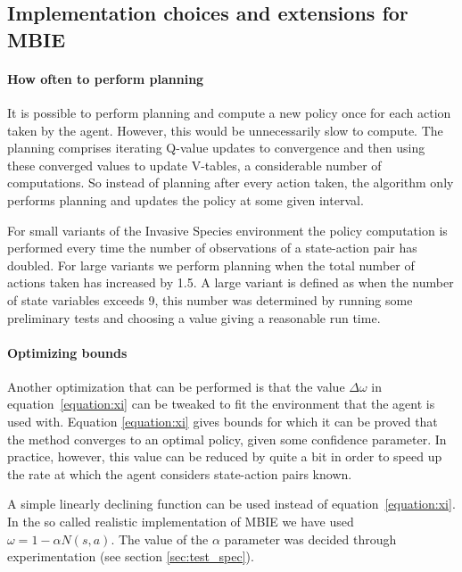 \subsection{Implementation choices and extensions for MBIE}
\label{sec:MBIE_our_contribution}

\paragraph{How often to perform planning}
\label{sec:mbie_perform_planning}

It is possible to perform planning and compute a new policy once for each
action taken by the agent. However, this would be unnecessarily slow to
compute. The planning comprises iterating Q-value updates to convergence and
then using these converged values to update V-tables, a considerable number of
computations. So instead of planning after every action taken, the algorithm
only performs planning and updates the policy at some given interval. 

For small variants of the Invasive Species environment the policy computation
is performed every time the number of observations of a state-action pair has
doubled. For large variants we perform planning when the total number of
actions taken has increased by 1.5. A large variant is defined as when the
number of state variables exceeds 9, this number was determined by running some
preliminary tests and choosing a value giving a reasonable run time.

\paragraph{Optimizing bounds}

Another optimization that can be performed is that the value $\Delta \omega$ in
equation~\eqref{equation:xi} can be tweaked to fit the environment that the
agent is used with. Equation \eqref{equation:xi} gives bounds for which it can
be proved that the method converges to an optimal policy, given some confidence parameter. In practice,
however, this value can be reduced by quite a bit in order to speed up the rate
at which the agent considers state-action pairs known. 

A simple linearly declining function can be used instead of
equation~\eqref{equation:xi}. In the so called realistic implementation of MBIE we have
used $\omega = 1 - \alpha N(s,a).$ The value of the $\alpha$ parameter was decided through experimentation (see section \ref{sec:test_spec}).

